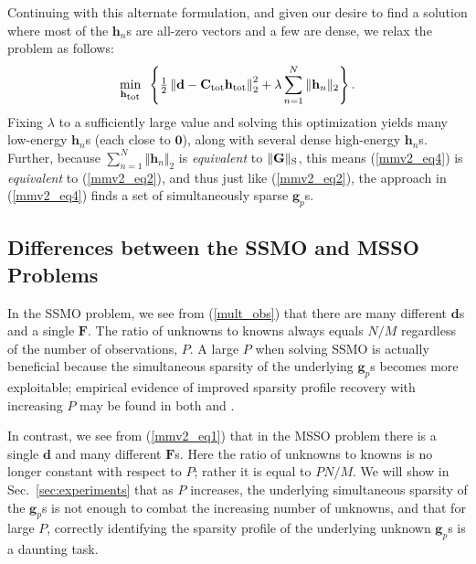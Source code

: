 \documentclass[final]{siamltex}
\newcommand{\la}[1]{\mbox{$\mathbf{#1}$}}  \newcommand{\sst}[1]{\mbox{\scriptsize{#1}}}
\newcommand{\Frac}[2]{{{#1}/{#2}}}
\begin{document}
   Continuing with this alternate formulation, and given our desire
   to find a solution where most of the $\la{h}_n$s are all-zero
   vectors and a few are dense, we relax the problem as follows:
   \begin{equation}\label{mmv2_eq4}
   \mathop{\mbox{min}}_{\mbox{\scriptsize{$\la{h}_{\sst{tot}}$}}}
   \mbox{  }
      \left \{
        \tfrac{1}{2}  \left \Vert \la{d} -
                      \la{C}_{\mbox{\scriptsize{tot}}}
                      \la{h}_{\mbox{\scriptsize{tot}}}
                      \right \Vert_2^2
       +     \lambda  \sum_{n=1}^{N} \Vert \la{h}_n \Vert_2
      \right \}.
   \end{equation}
   Fixing $\lambda$ to a sufficiently large value and solving this
   optimization yields many low-energy $\la{h}_n$s (each close to
   \la{0}), along with several dense high-energy $\la{h}_n$s.
   Further, because $\sum_{n=1}^{N} \Vert \la{h}_n \Vert_2$ is
   {\em{equivalent}} to $\Vert \la{G} \Vert_{\mbox{\scriptsize{S}}}$,
   this means (\ref{mmv2_eq4}) is {\em{equivalent}} to
   (\ref{mmv2_eq2}), and thus just like (\ref{mmv2_eq2}), the approach
   in (\ref{mmv2_eq4}) finds a set of simultaneously sparse
   $\la{g}_p$s.

\subsection{Differences between the SSMO and MSSO Problems}

   In the SSMO problem, we see from (\ref{mult_obs}) that there are
   many different \la{d}s and a single \la{F}.  The ratio of unknowns
   to knowns always equals $N/M$ regardless of the number of
   observations, $P$.  A large $P$ when solving SSMO is actually
   beneficial because the simultaneous sparsity of the underlying
   $\la{g}_p$s becomes more exploitable; empirical evidence of
   improved sparsity profile recovery with increasing $P$ may be found
   in both \cite{Cot2005} and \cite{Mal2005}.

   In contrast, we see from (\ref{mmv2_eq1}) that in the MSSO problem
   there is a single \la{d} and many different \la{F}s.  Here the
   ratio of unknowns to knowns is no longer constant with respect to
   $P$; rather it is equal to $\Frac{PN}{M}$.  We will show in
   Sec.~\ref{sec:experiments} that as $P$ increases, the underlying
   simultaneous sparsity of the $\la{g}_p$s is not enough to combat
   the increasing number of unknowns, and that for large $P$,
   correctly identifying the sparsity profile of the underlying
   unknown $\la{g}_p$s is a daunting task.
   
\end{document}

